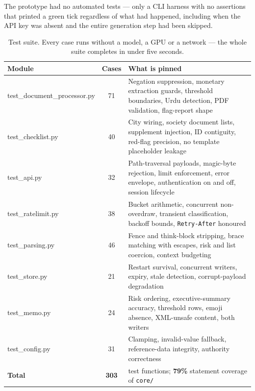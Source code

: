 \documentclass[11pt,a4paper]{article}
\newcommand{\code}[1]{\texttt{\small #1}}
\begin{document}
The prototype had no automated tests --- only a CLI harness with no assertions that printed
a green tick regardless of what had happened, including when the API key was absent and the
entire generation step had been skipped.

\begin{table}[H]
\centering\footnotesize
\begin{tabularx}{\linewidth}{@{}>{\ttfamily}l c X@{}}
\toprule
\rowcolor{mist}\normalfont\textbf{Module} & \textbf{Cases} & \textbf{What is pinned} \\
\midrule
test\_document\_processor.py & 71 & Negation suppression, monetary extraction guards, threshold boundaries, Urdu detection, PDF validation, flag-report shape \\
test\_checklist.py           & 40 & City wiring, society document lists, supplement injection, ID contiguity, red-flag precision, no template placeholder leakage \\
test\_api.py                 & 32 & Path-traversal payloads, magic-byte rejection, limit enforcement, error envelope, authentication on and off, session lifecycle \\
test\_ratelimit.py           & 38 & Bucket arithmetic, concurrent non-overdraw, transient classification, backoff bounds, \code{Retry-After} honoured \\
test\_parsing.py             & 46 & Fence and think-block stripping, brace matching with escapes, risk and list coercion, context budgeting \\
test\_store.py               & 21 & Restart survival, concurrent writers, expiry, stale detection, corrupt-payload degradation \\
test\_memo.py                & 24 & Risk ordering, executive-summary accuracy, threshold rows, emoji absence, XML-unsafe content, both writers \\
test\_config.py              & 31 & Clamping, invalid-value fallback, reference-data integrity, authority correctness \\
\midrule
\normalfont\textbf{Total} & \textbf{303} & \normalfont 241 test functions; \textbf{79\%} statement coverage of \code{core/} \\
\bottomrule
\end{tabularx}
\caption{Test suite. Every case runs without a model, a GPU or a network --- the whole
suite completes in under five seconds.}
\end{table}
\end{document}

